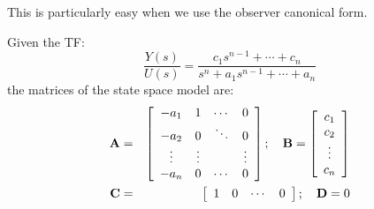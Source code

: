 This is particularly easy when we use the observer canonical form.

Given the TF:
\[
\frac{Y(s)}{U(s)}=\frac{c_1s^{n-1}+\cdots+c_n}{s^n + a_1s^{n-1}+\cdots+a_n}
\]
the matrices of the state space model are:
\begin{eqnarray*}
	 {\bf{A}} & = & \left[ {\begin{array}{*{20}c}
	   { - a_1 } & 1 &  \cdots  & 0  \\
	   { - a_2 } & 0 &  \ddots  & {0}  \\
	    \vdots  &  \vdots  & {} &  \vdots   \\
	   { - a_n } & 0 &  \cdots  & 0  \\
	\end{array}} \right];\quad {\bf{B}} = \left[ {\begin{array}{*{20}c}
	   {c_1 }  \\
	   {c_2 }  \\
	    \vdots   \\
	   {c_n }  \\
	\end{array}} \right] \\ 
	 {\bf{C}} & = & \left[ {\begin{array}{*{20}c}
	   1 & 0 &  \cdots  & 0  \\
	\end{array}} \right];\quad {\bf{D}} = 0 \\ 	
\end{eqnarray*}


\endinput

